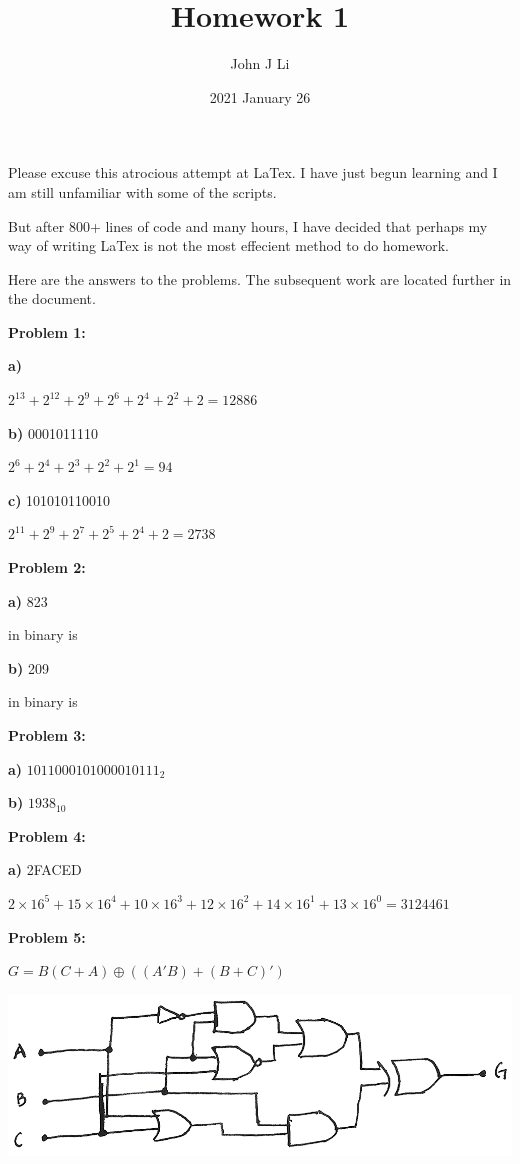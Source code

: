 \documentclass{article}
\title{Homework 1}
\date{2021 January 26}
\author{John J Li}
\begin{document}
    \maketitle
    \noindent
    Please excuse this atrocious attempt at LaTex. I have just begun learning
    and I am still unfamiliar with some of the scripts.

    \noindent
    But after 800+ lines of code and many hours, I have decided that perhaps my way of writing LaTex is not the most effecient
    method to do homework.
    \newpage

    \noindent
    Here are the answers to the problems. The subsequent work are located further in
    the document.

    \textbf{Problem 1:}

    \quad \textbf{a)}

    \quad\quad $2^{13} + 2^{12} + 2^9 + 2^6 + 2^4 + 2^2 + 2 = \boxed{12886}$

    \quad \textbf{b)} 0001011110

    \quad\quad $2^6 + 2^4 + 2^3 + 2^2 + 2^1 = \boxed{94}$

    \quad \textbf{c)} 101010110010

    \quad\quad $2^{11} + 2^9 + 2^7 + 2^5 + 2^4 + 2 = \boxed{2738}$

    \textbf{Problem 2:}

    \quad \textbf{a)} 823

    \quad{} in binary is 

    \quad \textbf{b)} 209

    \quad{} in binary is 

    \textbf{Problem 3:}

    \quad \textbf{a)} $1011000101000010111_2$

    \quad\quad {}

    \quad \textbf{b)} $1938_{10}$

    \quad\quad {}

    \textbf{Problem 4:}

    \quad \textbf{a)} 2FACED

    \quad\quad $2 \times 16^5 + 
        15 \times 16^4 + 
        10 \times 16^3 +
        12 \times 16^2 + 
        14 \times 16^1 + 
        13 \times 16^0 = \boxed{3124461}$

    \textbf{Problem 5:}
    
    $G = B(C+A) \oplus ((A'B) + (B+C)')$
    \begin{center}
        \includegraphics{001.png}
    \end{center}
\end{document}
